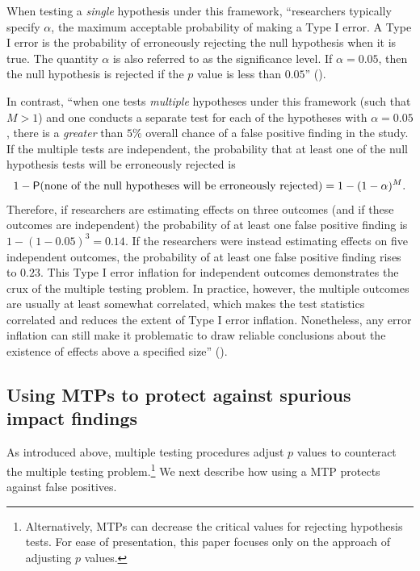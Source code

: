 \documentclass[
]{jss}
\begin{document}
When testing a \emph{single} hypothesis under this framework,
``researchers typically specify \(\alpha\), the maximum acceptable
probability of making a Type I error. A Type I error is the probability
of erroneously rejecting the null hypothesis when it is true. The
quantity \(\alpha\) is also referred to as the significance level. If
\(\alpha=0.05\), then the null hypothesis is rejected if the \(p\) value
is less than \(0.05\)'' (\citet{Porter2018}).

In contrast, ``when one tests \emph{multiple} hypotheses under this
framework (such that \(M>1\)) and one conducts a separate test for each
of the hypotheses with \(\alpha=0.05\), there is a \emph{greater} than
\(5\%\) overall chance of a false positive finding in the study. If the
multiple tests are independent, the probability that at least one of the
null hypothesis tests will be erroneously rejected is
\[1-\mathsf{P}(\text{none of the null hypotheses will be erroneously rejected}) = 1-(1-\alpha)^M.\]
Therefore, if researchers are estimating effects on three outcomes (and
if these outcomes are independent) the probability of at least one false
positive finding is \(1-(1-0.05)^3=0.14\). If the researchers were
instead estimating effects on five independent outcomes, the probability
of at least one false positive finding rises to \(0.23\). This Type I
error inflation for independent outcomes demonstrates the crux of the
multiple testing problem. In practice, however, the multiple outcomes
are usually at least somewhat correlated, which makes the test
statistics correlated and reduces the extent of Type I error inflation.
Nonetheless, any error inflation can still make it problematic to draw
reliable conclusions about the existence of effects above a specified
size'' (\citet{Porter2018}).

\subsection{Using MTPs to protect against spurious impact findings}
\label{sec:mtp_use}

As introduced above, multiple testing procedures adjust \(p\) values to
counteract the multiple testing problem.\footnote{Alternatively, MTPs
  can decrease the critical values for rejecting hypothesis tests. For
  ease of presentation, this paper focuses only on the approach of
  adjusting \(p\) values.} We next describe how using a MTP protects
against false positives.
\end{document}
